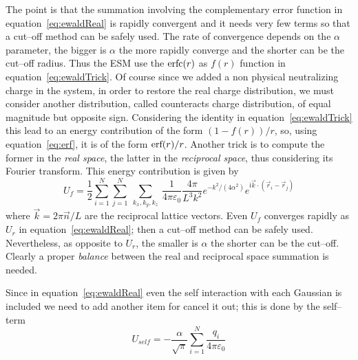 The point is that the summation involving the complementary error function in equation~\eqref{eq:ewaldReal} is rapidly convergent and it needs very few terms so that a cut--off method can be safely used. The rate of convergence depends on the $\alpha$ parameter, the bigger is $\alpha$ the more rapidly converge and the shorter can be the cut--off radius.
Thus the \ac{ESM} use the $\text{erfc}(r)$ as $f(r)$ function in equation~\eqref{eq:ewaldTrick}. Of course since we added a non physical neutralizing charge in the system, in order to restore the real charge distribution, we must consider another distribution, called counteracts charge distribution, of equal magnitude but opposite sign. Considering the identity in equation~\eqref{eq:ewaldTrick} this lead to an energy contribution of the form $(1-f(r))/r$, so, using equation~\eqref{eq:erf}, it is of the form $\text{erf}(r)/r$. Another trick is to compute the former in the \textit{real space}, the latter in the \textit{reciprocal space}, thus considering its Fourier transform. This energy contribution is given by
\begin{equation}
	U_f = \frac{1}{2}\sum_{i=1}^N\sum_{j=1}^N\ \sum_{k_x,k_y,k_z}\ \frac{1}{4\pi\varepsilon_0}\frac{4\pi}{L^3k^2}e^{-k^2/(4\alpha^2)}e^{\mathsf{i}{\vec k \cdot (\vec r_i - \vec r_j)}}
	\label{eq:ewaldReciprocal}
\end{equation}
where $\vec k = 2\pi\vec n/L$ are the reciprocal lattice vectors. Even $U_f$ converges rapidly as $U_r$ in equation~\eqref{eq:ewaldReal}; then a cut--off method can be safely used. Nevertheless, as opposite to $U_r$, the smaller is $\alpha$ the shorter can be the cut--off. Clearly a proper \textit{balance} between the real and reciprocal space summation is needed.

Since in equation~\eqref{eq:ewaldReal} even the self interaction with each Gaussian is included we need to add another item for cancel it out; this is done by the self--term
\begin{equation}
	U_{self} = -\frac{\alpha}{\sqrt{\pi}}\sum_{i=1}^N\frac{q_i}{4\pi\varepsilon_0}
	\label{eq:EwaldselfTerm}
\end{equation}

